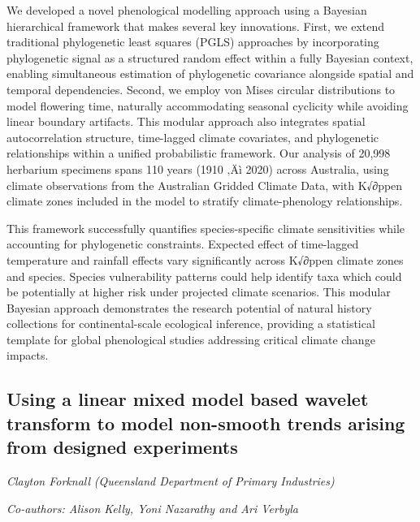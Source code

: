 \documentclass[
]{scrreprt}
\begin{document}
We developed a novel phenological modelling approach using a Bayesian
hierarchical framework that makes several key innovations. First, we
extend traditional phylogenetic least squares (PGLS) approaches by
incorporating phylogenetic signal as a structured random effect within a
fully Bayesian context, enabling simultaneous estimation of phylogenetic
covariance alongside spatial and temporal dependencies. Second, we
employ von Mises circular distributions to model flowering time,
naturally accommodating seasonal cyclicity while avoiding linear
boundary artifacts. This modular approach also integrates spatial
autocorrelation structure, time-lagged climate covariates, and
phylogenetic relationships within a unified probabilistic framework. Our
analysis of 20,998 herbarium specimens spans 110 years (1910 ‚Äì 2020)
across Australia, using climate observations from the Australian Gridded
Climate Data, with K√∂ppen climate zones included in the model to
stratify climate-phenology relationships.

This framework successfully quantifies species-specific climate
sensitivities while accounting for phylogenetic constraints. Expected
effect of time-lagged temperature and rainfall effects vary
significantly across K√∂ppen climate zones and species. Species
vulnerability patterns could help identify taxa which could be
potentially at higher risk under projected climate scenarios. This
modular Bayesian approach demonstrates the research potential of natural
history collections for continental-scale ecological inference,
providing a statistical template for global phenological studies
addressing critical climate change impacts.

\subsection{Using a linear mixed model based wavelet transform to model
non-smooth trends arising from designed
experiments}\label{using-a-linear-mixed-model-based-wavelet-transform-to-model-non-smooth-trends-arising-from-designed-experiments}

\emph{Clayton Forknall} \emph{(Queensland
Department of Primary Industries)}

\emph{Co-authors: Alison Kelly, Yoni Nazarathy and Ari Verbyla}

\setlength{\parskip}{0.5em}
\end{document}
